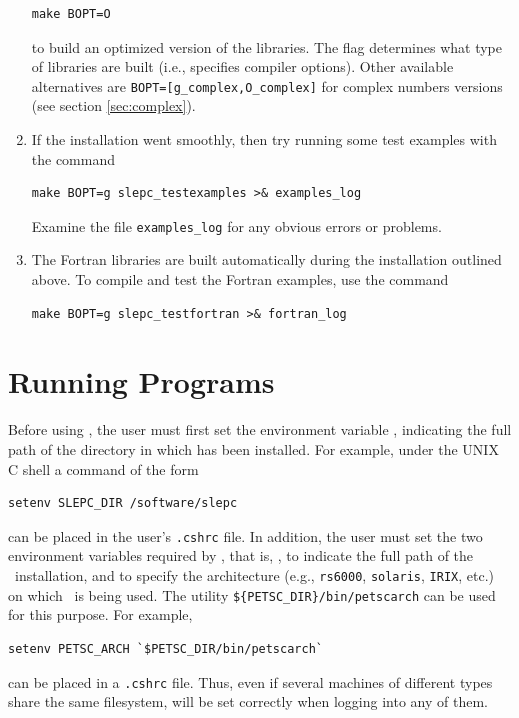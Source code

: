 \begin{enumerate}
\begin{Verbatim}[fontsize=\small]
	make BOPT=O
	\end{Verbatim}
      to build an optimized version of the \slepc libraries. The flag  determines what type of libraries are built (i.e., specifies compiler options). Other available alternatives are \Verb!BOPT=[g_complex,O_complex]! for complex numbers versions (see section \ref{sec:complex}).
	\item If the installation went smoothly, then try running some test examples with the command
	\begin{Verbatim}[fontsize=\small]
	make BOPT=g slepc_testexamples >& examples_log 
	\end{Verbatim}
     Examine the file \Verb!examples_log! for any obvious errors or problems.
	\item The Fortran libraries are built automatically during the installation outlined above. To compile and test the Fortran examples, use the command
	\begin{Verbatim}[fontsize=\small]
	make BOPT=g slepc_testfortran >& fortran_log
	\end{Verbatim}
\end{enumerate}
	
\section{Running \slepc Programs}

Before using \slepc, the user must first set the environment variable
, indicating the full path of the directory in which \slepc has been installed. For example, under the UNIX C shell a command of the form
	\begin{Verbatim}[fontsize=\small]
	setenv SLEPC_DIR /software/slepc
	\end{Verbatim}
can be placed in the user's \Verb!.cshrc! file. 
In addition, the user must set the two environment
variables required by \petsc, that is, , to indicate the full path of the \petsc\ installation, and  to specify the architecture (e.g., \texttt{rs6000},
\texttt{solaris}, \texttt{IRIX}, etc.)  on which \petsc\ is being used.  The utility
 \Verb!${PETSC_DIR}/bin/petscarch! can be used for this purpose.  For example,
	\begin{Verbatim}[fontsize=\small]
	setenv PETSC_ARCH `$PETSC_DIR/bin/petscarch`
	\end{Verbatim}
can be placed in a \Verb!.cshrc! file.  Thus, even if several machines of different
types share the same filesystem,  will be set correctly
when logging into any of them. 

